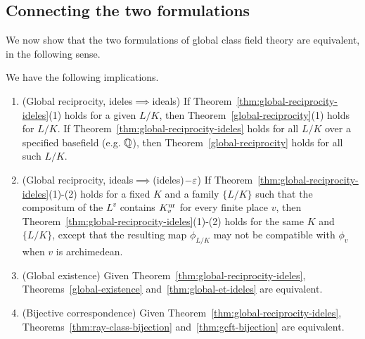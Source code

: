 \subsection{Connecting the two formulations}
We now show that the two formulations of global class field theory are equivalent, in the following sense.
\begin{thm}
We have the following implications.
\begin{enumerate}
\item (Global reciprocity, ideles$\implies$ideals)
If Theorem~\ref{thm:global-reciprocity-ideles}(1) holds for a given $L/K$, then Theorem~\ref{global-reciprocity}(1) holds for $L/K$. If Theorem~\ref{thm:global-reciprocity-ideles} holds for all $L/K$ over a specified basefield (e.g. $\mathbb{Q}$), then Theorem~\ref{global-reciprocity} holds for all such $L/K$.
\item (Global reciprocity, ideals$\implies$(ideles)$-\varepsilon$) If Theorem~\ref{thm:global-reciprocity-ideles}(1)-(2) holds for a fixed $K$ and a family $\{L/K\}$ such that the compositum of the $L^v$ contains $K^{\text{ur}}_v$ for every finite place $v$, then Theorem~\ref{thm:global-reciprocity-ideles}(1)-(2) holds for the same $K$ and $\{L/K\}$, except that the resulting map $\phi_{L/K}$ may not be compatible with $\phi_v$ when $v$ is archimedean.
\item (Global existence)
Given Theorem~\ref{thm:global-reciprocity-ideles}, Theorems~\ref{global-existence} and~\ref{thm:global-et-ideles} are equivalent.
\item (Bijective correspondence)
Given Theorem~\ref{thm:global-reciprocity-ideles}, Theorems~\ref{thm:ray-class-bijection} and~\ref{thm:gcft-bijection} are equivalent.
\end{enumerate}
\end{thm}
